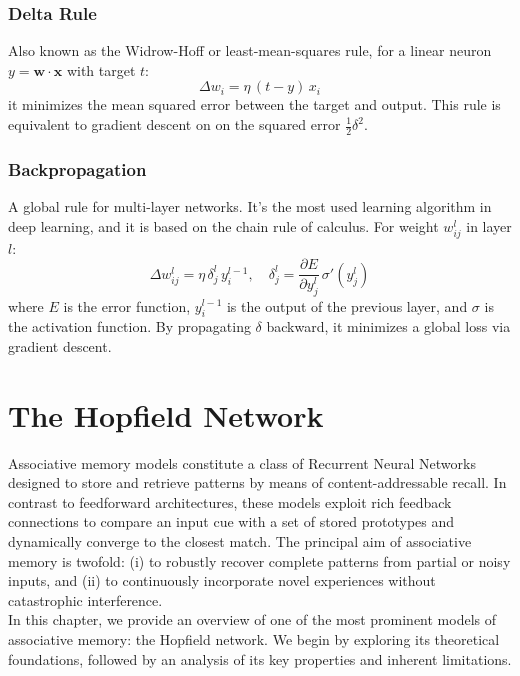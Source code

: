 \documentclass[a4paper,12pt]{report}
\begin{document}
\subsection*{Delta Rule}
Also known as the Widrow-Hoff or least-mean-squares rule, for a linear neuron 
$y=\mathbf{w}\cdot\mathbf{x}$ with target $t$:
\[
  \Delta w_i = \eta\,\left(t - y\right)\,x_i
\]
it minimizes the mean squared error between the target and output. This rule is 
equivalent to gradient descent on on the squared error $\frac12\delta^2$.

\subsection*{Backpropagation}
A global rule for multi-layer networks. It's the most used learning algorithm in deep 
learning, and it is based on the chain rule of calculus. For weight $w_{ij}^l$ in 
layer $l$:
\[
  \Delta w_{ij}^l = \eta\,\delta_j^l\,y_i^{l-1},\quad \delta_j^l = 
  \frac{\partial E}{\partial y_j^l}\,\sigma'(y_j^l)
\]
where $E$ is the error function, $y_i^{l-1}$ is the output of the previous layer, 
and $\sigma$ is the activation function.
By propagating $\delta$ backward, it minimizes a global loss via gradient descent.







\chapter{The Hopfield Network}
Associative memory models constitute a class of Recurrent Neural Networks designed to 
store and retrieve patterns by means of content-addressable recall. In contrast to 
feedforward architectures, these models exploit rich feedback connections to compare 
an input cue with a set of stored prototypes and dynamically converge to the closest 
match. The principal aim of associative memory is twofold: (i) to robustly recover 
complete patterns from partial or noisy inputs, and (ii) to continuously incorporate 
novel experiences without catastrophic interference. \\
In this chapter, we provide an overview of one of the most prominent models 
of associative memory: the Hopfield network. We begin by exploring its theoretical 
foundations, followed by an analysis of its key properties and inherent limitations.
\end{document}
